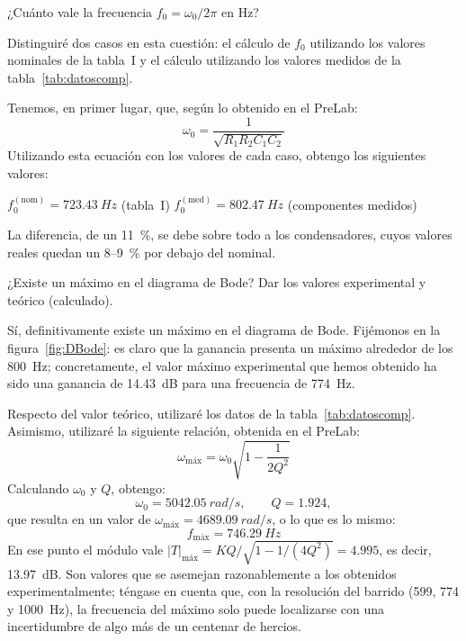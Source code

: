 \documentclass[a4paper,11pt]{article}
\begin{document}
\begin{pregunta}
¿Cuánto vale la frecuencia $f_0=\omega_0/2\pi$ en Hz?
\end{pregunta}

Distinguiré dos casos en esta cuestión: el cálculo de $f_0$ utilizando los valores nominales de la tabla~I y el cálculo utilizando los valores medidos de la tabla~\ref{tab:datoscomp}.

Tenemos, en primer lugar, que, según lo obtenido en el PreLab:
\begin{equation}
    \omega_0 = \frac{1}{\sqrt{R_1R_2C_1C_2}}
\end{equation}
Utilizando esta ecuación con los valores de cada caso, obtengo los siguientes valores:
\begin{resultado}
  $f_0^{(\text{nom})} = \qty{723.43}{Hz}$ \quad(tabla~I)
  \qquad\qquad
  $f_0^{(\text{med})} = \qty{802.47}{Hz}$ \quad(componentes medidos)
\end{resultado}
La diferencia, de un \qty{11}{\percent}, se debe sobre todo a los condensadores, cuyos valores reales quedan un \qty{8}{}--\qty{9}{\percent} por debajo del nominal.

\begin{pregunta}
¿Existe un máximo en el diagrama de Bode? Dar los valores experimental y teórico (calculado).
\end{pregunta}

Sí, definitivamente existe un máximo en el diagrama de Bode. Fijémonos en la figura~\ref{fig:DBode}: es claro que la ganancia presenta un máximo alrededor de los \qty{800}{Hz}; concretamente, el valor máximo experimental que hemos obtenido ha sido una ganancia de \qty{14.43}{dB} para una frecuencia de \qty{774}{Hz}.

Respecto del valor teórico, utilizaré los datos de la tabla~\ref{tab:datoscomp}. Asimismo, utilizaré la siguiente relación, obtenida en el PreLab:
\begin{equation}
    \omega_{\text{máx}} = \omega_0\sqrt{1-\frac{1}{2Q^2}}
\end{equation}
Calculando $\omega_0$ y $Q$, obtengo:
\begin{equation*}
  \omega_0 = \qty{5042.05}{rad/s},\qquad Q = \num{1.924},
\end{equation*}
que resulta en un valor de $\omega_{\text{máx}} = \qty{4689.09}{rad/s}$, o lo que es lo mismo:
\begin{equation}
    f_{\text{máx}} = \qty{746.29}{Hz}
\end{equation}
En ese punto el módulo vale $|T|_{\text{máx}}=KQ\big/\sqrt{1-1/(4Q^2)}=\num{4.995}$, es decir, \qty{13.97}{dB}. Son valores que se asemejan razonablemente a los obtenidos experimentalmente; téngase en cuenta que, con la resolución del barrido (\qty{599}{}, \qty{774}{} y \qty{1000}{Hz}), la frecuencia del máximo solo puede localizarse con una incertidumbre de algo más de un centenar de hercios.
\end{document}
